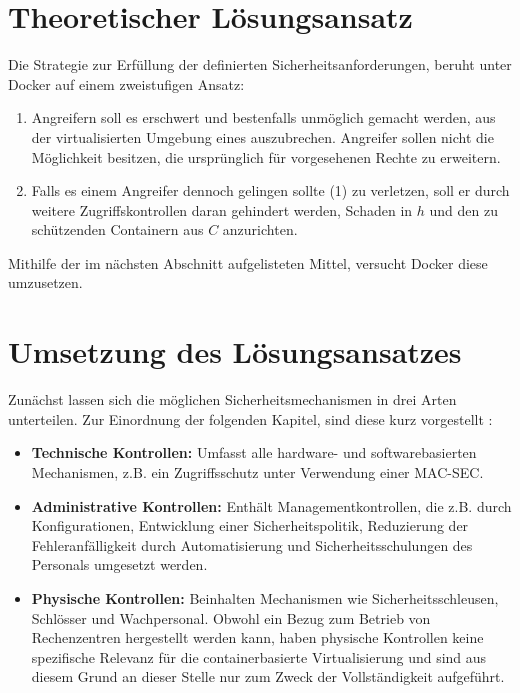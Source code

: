 \documentclass[../main.tex]{subfiles}
\begin{document}
  \section{Theoretischer Lösungsansatz}
  \label{questionSolutionTheory}
    Die Strategie zur Erfüllung der definierten Sicherheitsanforderungen, beruht unter Docker auf einem zweistufigen Ansatz:

    \begin{enumerate}[label=(\arabic*)]
      \item Angreifern soll es erschwert und bestenfalls unmöglich gemacht werden, aus der virtualisierten Umgebung eines \cbroken{} auszubrechen. Angreifer sollen nicht die Möglichkeit besitzen, die ursprünglich für \cbroken{} vorgesehenen Rechte zu erweitern.
      \item Falls es einem Angreifer dennoch gelingen sollte (1) zu verletzen, soll er durch weitere Zugriffskontrollen daran gehindert werden, Schaden in \(h\) und den zu schützenden Containern aus \(C\) anzurichten.
    \end{enumerate}

    Mithilfe der im nächsten Abschnitt aufgelisteten Mittel, versucht Docker diese umzusetzen.


  \section{Umsetzung des Lösungsansatzes} %
  \label{questionRealization}
    Zunächst lassen sich die möglichen Sicherheitsmechanismen in drei Arten unterteilen. Zur Einordnung der folgenden Kapitel, sind diese kurz vorgestellt \cite[S.40ff.]{CISSP}\cite[S.23]{nist}:

    \begin{itemize}
      \item \textbf{Technische Kontrollen:} Umfasst alle hardware- und softwarebasierten Mechanismen, z.B. ein Zugriffsschutz unter Verwendung einer \acrshort{MAC-SEC}.
      \item \textbf{Administrative Kontrollen:} Enthält Managementkontrollen, die z.B. durch Konfigurationen, Entwicklung einer Sicherheitspolitik, Reduzierung der Fehleranfälligkeit durch Automatisierung und Sicherheitsschulungen des Personals umgesetzt werden.
      \item \textbf{Physische Kontrollen:} Beinhalten Mechanismen wie Sicherheitsschleusen, Schlösser und Wachpersonal. Obwohl ein Bezug zum Betrieb von Rechenzentren hergestellt werden kann, haben physische Kontrollen keine spezifische Relevanz für die containerbasierte Virtualisierung und sind aus diesem Grund an dieser Stelle nur zum Zweck der Vollständigkeit aufgeführt.
    \end{itemize}
\end{document}
